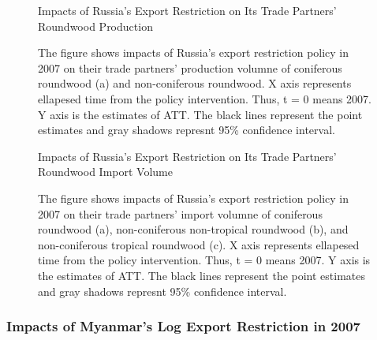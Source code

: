 \documentclass[a4paper,12pt]{article}
\begin{document}
\begin{figure}[H] 
    \centering
    \caption{Impacts of Russia's Export Restriction on Its Trade Partners' Roundwood Production}
    \caption*{\small{The figure shows impacts of Russia's export restriction policy in 2007 on their trade partners' production volumne of coniferous roundwood (a) and non-coniferous roundwood. X axis represents ellapesed time from the policy intervention. Thus, t = 0 means 2007. Y axis is the estimates of ATT. The black lines represent the point estimates and gray shadows represnt 95\% confidence interval.}}
    \label{fig:cf_prod_Russia}
\end{figure}

\begin{figure}[H] 
    \centering
    \caption{Impacts of Russia's Export Restriction on Its Trade Partners' Roundwood Import Volume}
    \caption*{\small{The figure shows impacts of Russia's export restriction policy in 2007 on their trade partners' import volumne of coniferous roundwood (a), non-coniferous non-tropical roundwood (b), and non-coniferous tropical roundwood (c). X axis represents ellapesed time from the policy intervention. Thus, t = 0 means 2007. Y axis is the estimates of ATT. The black lines represent the point estimates and gray shadows represnt 95\% confidence interval.}}
    \label{fig:cf_imp_Russia}
\end{figure}

\subsubsection*{Impacts of Myanmar's Log Export Restriction in 2007}
\end{document}
